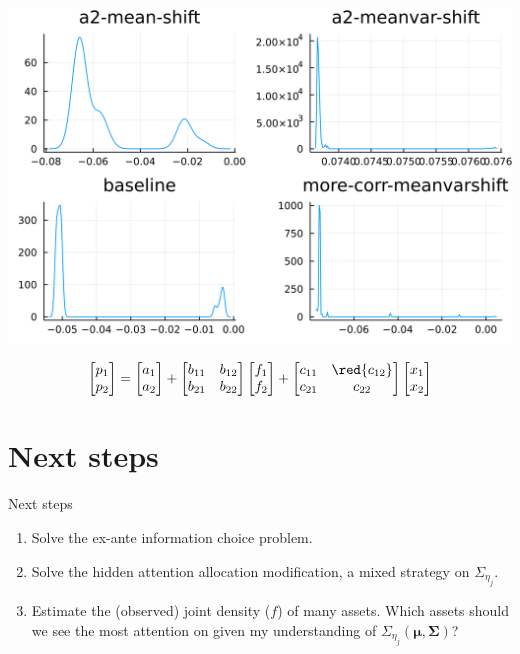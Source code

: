 \documentclass[
  ignorenonframetext,
]{beamer}
\providecommand{\tightlist}{%
  \setlength{\itemsep}{0pt}\setlength{\parskip}{0pt}}
\begin{document}
\begin{frame}{}
\protect\hypertarget{section-11}{}
\begin{center}\includegraphics[width=0.95\paperheight]{complexity_files/figure-beamer/unnamed-chunk-33-1} \end{center}

\[
\begin{bmatrix}
 p_1 \\ p_2
\end{bmatrix} =
\begin{bmatrix}
 a_1 \\ {a_2}
\end{bmatrix}
 + 
 \begin{bmatrix}
 {b_{11}} & b_{12} \\
 {b_{21}} & {b_{22}}
\end{bmatrix}
\begin{bmatrix}
 f_1 \\ f_2
\end{bmatrix}
+
 \begin{bmatrix}
 {c_{11}} & \red{c_{12}} \\
 c_{21} & {c_{22}}
\end{bmatrix} 
\begin{bmatrix}
 x_1 \\ x_2
\end{bmatrix}
\]
\end{frame}

\hypertarget{next-steps}{%
\section{Next steps}\label{next-steps}}

\begin{frame}{Next steps}
\protect\hypertarget{next-steps-1}{}
\begin{enumerate}
\tightlist
\item
  Solve the ex-ante information choice problem.
\item
  Solve the hidden attention allocation modification, a mixed strategy
  on \(\Sigma_{\eta_j}\).
\item
  Estimate the (observed) joint density (\(f\)) of many assets. Which
  assets should we see the most attention on given my understanding of
  \(\Sigma_{\eta_j}(\mathbf{\mu}, \mathbf{\Sigma})\)?
\end{enumerate}
\end{frame}
\end{document}
